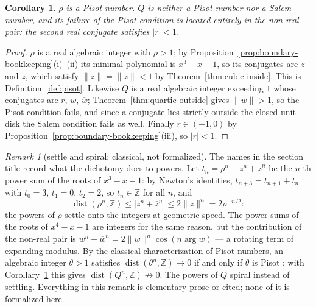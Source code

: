 \documentclass[11pt]{amsart}
\theoremstyle{plain}
\newtheorem{corollary}[theorem]{Corollary}
\theoremstyle{definition}
\theoremstyle{remark}
\newtheorem{remark}[theorem]{Remark}
\begin{document}
\begin{corollary}\label{cor:boundary-pisot}
$\rho$ is a Pisot number. $Q$ is neither a Pisot number nor a Salem number, and its failure of the Pisot condition is located entirely in the non-real pair: the second real conjugate satisfies $\lvert r \rvert < 1$.
\end{corollary}

\begin{proof}
$\rho$ is a real algebraic integer with $\rho > 1$; by Proposition~\ref{prop:boundary-bookkeeping}(i)--(ii) its minimal polynomial is $x^3 - x - 1$, so its conjugates are $z$ and $\overline{z}$, which satisfy $\lVert z \rVert = \lVert \overline{z} \rVert < 1$ by Theorem~\ref{thm:cubic-inside}. This is Definition~\ref{def:pisot}. Likewise $Q$ is a real algebraic integer exceeding $1$ whose conjugates are $r$, $w$, $\overline{w}$; Theorem~\ref{thm:quartic-outside} gives $\lVert w \rVert > 1$, so the Pisot condition fails, and since a conjugate lies strictly outside the closed unit disk the Salem condition fails as well. Finally $r \in (-1, 0)$ by Proposition~\ref{prop:boundary-bookkeeping}(iii), so $\lvert r \rvert < 1$.
\end{proof}

\begin{remark}[settle and spiral; classical, not formalized]\label{rem:boundary-powers}
The names in the section title record what the dichotomy does to powers. Let $t_n = \rho^n + z^n + \overline{z}^n$ be the $n$-th power sum of the roots of $x^3 - x - 1$: by Newton's identities, $t_{n+3} = t_{n+1} + t_n$ with $t_0 = 3$, $t_1 = 0$, $t_2 = 2$, so $t_n \in \mathbb{Z}$ for all $n$, and
\[
\operatorname{dist}(\rho^n, \mathbb{Z}) \le \lvert z^n + \overline{z}^n \rvert \le 2 \lVert z \rVert^n = 2 \rho^{-n/2} :
\]
the powers of $\rho$ settle onto the integers at geometric speed. The power sums of the roots of $x^4 - x - 1$ are integers for the same reason, but the contribution of the non-real pair is $w^n + \overline{w}^n = 2 \lVert w \rVert^n \cos(n \arg w)$ --- a rotating term of expanding modulus. By the classical characterization of Pisot numbers, an algebraic integer $\theta > 1$ satisfies $\operatorname{dist}(\theta^n, \mathbb{Z}) \to 0$ if and only if $\theta$ is Pisot \cite{bertin1992}; with Corollary~\ref{cor:boundary-pisot} this gives $\operatorname{dist}(Q^n, \mathbb{Z}) \not\to 0$. The powers of $Q$ spiral instead of settling. Everything in this remark is elementary prose or cited; none of it is formalized here.
\end{remark}
\end{document}
